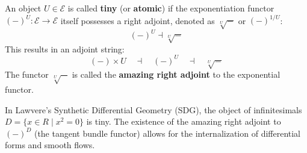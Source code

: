 \documentclass{article}
\begin{document}
\begin{definition}
An object $U \in \mathcal{E}$ is called \textbf{tiny} (or \textbf{atomic}) if the exponentiation functor $(-)^U : \mathcal{E} \to \mathcal{E}$ itself possesses a right adjoint, denoted as $\sqrt[U]{-}$ or $(-)^{1/U}$:
\[
(-)^U \dashv \sqrt[U]{-}
\]
This results in an adjoint string:
\[
(-) \times U \quad \dashv \quad (-)^U \quad \dashv \quad \sqrt[U]{-}
\]
The functor $\sqrt[U]{-}$ is called the \textbf{amazing right adjoint} to the exponential functor.
\end{definition}

\begin{example}
In Lawvere's Synthetic Differential Geometry (SDG), the object of infinitesimals $D = \{x \in R \mid x^2 = 0\}$ is tiny. The existence of the amazing right adjoint to $(-)^D$ (the tangent bundle functor) allows for the internalization of differential forms and smooth flows.
\end{example}
\end{document}
